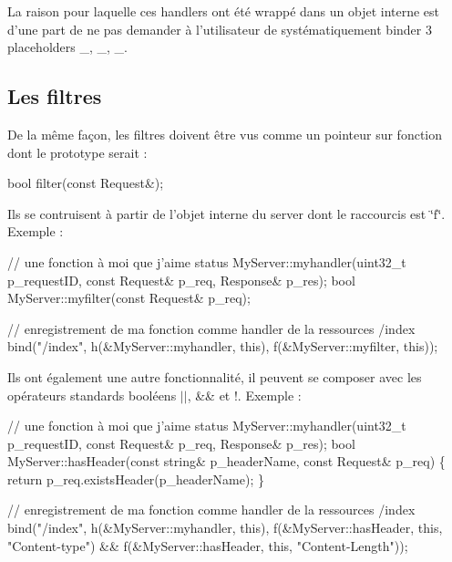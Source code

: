 La raison pour laquelle ces handlers ont été wrappé dans un objet interne est d'une part de ne pas demander à l'utilisateur de systématiquement binder 3 placeholders \-\_, \-\_, \-\_.

\par
 \subsection*{Les filtres }

De la même façon, les filtres doivent être vus comme un pointeur sur fonction dont le prototype serait \-: 
\begin{DoxyCode}
\textcolor{keywordtype}{bool} filter(\textcolor{keyword}{const} Request&);
\end{DoxyCode}


Ils se contruisent à partir de l'objet interne du server dont le raccourcis est \char`\"{}f\char`\"{}. Exemple \-: 
\begin{DoxyCode}
\textcolor{comment}{// une fonction à moi que j'aime}
status MyServer::myhandler(uint32\_t p\_requestID, \textcolor{keyword}{const} Request& p\_req, Response& p\_res);
\textcolor{keywordtype}{bool}  MyServer::myfilter(\textcolor{keyword}{const} Request& p\_req);

\textcolor{comment}{// enregistrement de ma fonction comme handler de la ressources /index}
bind(\textcolor{stringliteral}{"/index"}, h(&MyServer::myhandler, \textcolor{keyword}{this}), f(&MyServer::myfilter, \textcolor{keyword}{this}));
\end{DoxyCode}


Ils ont également une autre fonctionnalité, il peuvent se composer avec les opérateurs standards booléens $\vert$$\vert$, \&\& et !. Exemple \-:


\begin{DoxyCode}
\textcolor{comment}{// une fonction à moi que j'aime}
status MyServer::myhandler(uint32\_t p\_requestID, \textcolor{keyword}{const} Request& p\_req, Response& p\_res);
\textcolor{keywordtype}{bool}  MyServer::hasHeader(\textcolor{keyword}{const} \textcolor{keywordtype}{string}& p\_headerName, \textcolor{keyword}{const} Request& p\_req)
\{
  \textcolor{keywordflow}{return} p\_req.existsHeader(p\_headerName);
\}

\textcolor{comment}{// enregistrement de ma fonction comme handler de la ressources /index}
bind(\textcolor{stringliteral}{"/index"},
     h(&MyServer::myhandler, \textcolor{keyword}{this}),
     f(&MyServer::hasHeader, \textcolor{keyword}{this}, \textcolor{stringliteral}{"Content-type"}) &&
     f(&MyServer::hasHeader, \textcolor{keyword}{this}, \textcolor{stringliteral}{"Content-Length"}));
\end{DoxyCode}


